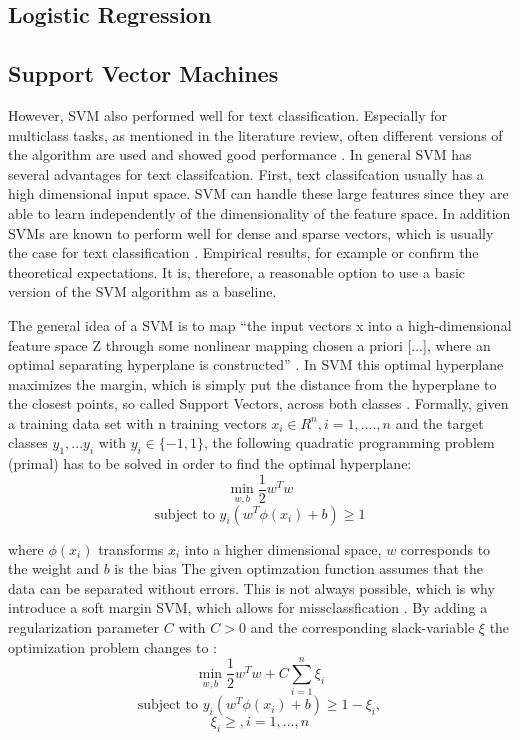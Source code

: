 \documentclass[12pt, a4paper, titlepage]{article}
\begin{document}
\subsection{Logistic Regression}

\subsection{Support Vector Machines}
However, \ac{SVM} also performed well for text classification. Especially for multiclass tasks, as mentioned in the literature review, often different versions of the algorithm are used and showed good performance \citep{Aiolli2005,Angulo2003,Benabdeslem2006,Guo2015,Mayoraz1999,Tang2019,Tomar2015}. In general \ac{SVM} has several advantages for text classifcation. First, text classifcation usually has a high dimensional input space. \ac{SVM} can handle these large features since they are able to learn independently of the dimensionality of the feature space. In addition \ac{SVM}s are known to perform well for dense and sparse vectors, which is usually the case for text classification \citep{Joachims1998}. Empirical results, for example \citet{Joachims1998} or \cite{Liu2010} confirm the theoretical expectations. It is, therefore, a reasonable option to use a basic version of the \ac{SVM} algorithm as a baseline.

The general idea of a \ac{SVM} is to map ``the input vectors x into a high-dimensional feature space Z through some nonlinear mapping chosen a priori [...], where an optimal separating hyperplane is constructed'' \citep[138]{Vapnik2000}. In \ac{SVM} this optimal hyperplane maximizes the margin, which is simply put the distance from the hyperplane to the closest points, so called Support Vectors, across both classes \citep{Han2012}. Formally, given a training data set with n training vectors $x_i \in R^n, i = 1,....,n$ and the target classes $y_1,...y_i$ with $y_i \in \{-1, 1\}$, the following quadratic programming problem (primal) has to be solved in order to find the optimal hyperplane:
\[\min_{w,b} \frac{1}{2}w^{T}w \] 
\[\text{subject to } y_i(w^T\phi(x_i)+b) \geq 1\]

where $\phi(x_i)$ transforms $x_i$ into a higher dimensional space, $w$ corresponds to the weight and $b$ is the bias \citep{Chang2001,Jordan2006}
The given optimzation function assumes that the data can be separated without errors. This is not always possible, which is why \cite{Cortes1995} introduce a soft margin \ac{SVM}, which allows for missclassfication \citep{Vapnik2000}.
By adding a regularization parameter $C$ with $C > 0$ and the corresponding slack-variable $\xi$ the optimization problem changes to \citep{Chang2001, Han2012}: 
\[\min_{w,b} \frac{1}{2}w^{T}w + C \sum_{i=1}^n \xi_i \] 
\[\text{subject to } y_i(w^T\phi(x_i)+b) \geq 1 - \xi_i, \] 
\[\xi_i \geq, i = 1,...,n\]
\end{document}
